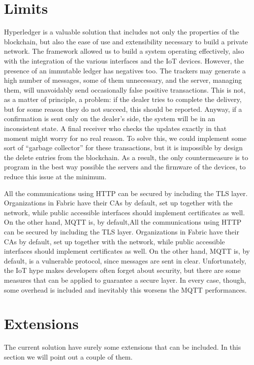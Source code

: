 \section{Limits}
Hyperledger is a valuable solution that includes not only the properties of the blockchain, but also the ease of use and extensibility necessary to build a private network. The framework allowed us to build a system operating effectively, also with the integration of the various interfaces and the IoT devices. However, the presence of an immutable ledger has negatives too. The trackers may generate a high number of messages, some of them unnecessary, and the server, managing them, will unavoidably send occasionally false positive transactions. This is not, as a matter of principle, a problem: if the dealer tries to complete the delivery, but for some reason they do not succeed, this should be reported. Anyway, if a confirmation is sent only on the dealer's side, the system will be in an inconsistent state. A final receiver who checks the updates exactly in that moment might worry for no real reason. To solve this, we could implement some sort of ``garbage collector'' for these transactions, but it is impossible by design the delete entries from the blockchain. As a result, the only countermeasure is to program in the best way possible the servers and the firmware of the devices, to reduce this issue at the minimum.

All the communications using HTTP can be secured by including the TLS layer. Organizations in Fabric have their CAs by default, set up together with the network, while public accessible interfaces should implement certificates as well. On the other hand, MQTT is, by default,All the communications using HTTP can be secured by including the TLS layer. Organizations in Fabric have their CAs by default, set up together with the network, while public accessible interfaces should implement certificates as well. On the other hand, MQTT is, by default, is a vulnerable protocol, since messages are sent in clear. Unfortunately, the IoT hype makes developers often forget about security, but there are some measures that can be applied to guarantee a secure layer. In every case, though, some overhead is included and inevitably this worsens the MQTT performances.

\section{Extensions}
The current solution have surely some extensions that can be included. In this section we will point out a couple of them.

